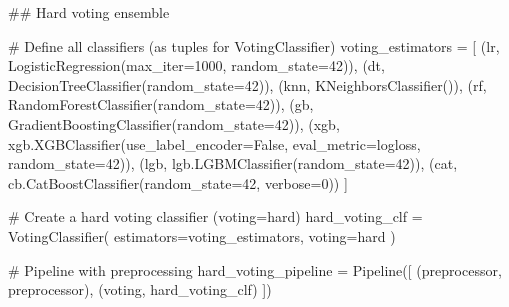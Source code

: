 \documentclass[
  letterpaper,
  DIV=11,
  numbers=noendperiod]{scrreprt}
\newenvironment{Shaded}{\begin{snugshade}}{\end{snugshade}}
\newcommand{\CommentTok}[1]{\textcolor[rgb]{0.37,0.37,0.37}{#1}}
\newcommand{\DecValTok}[1]{\textcolor[rgb]{0.68,0.00,0.00}{#1}}
\newcommand{\NormalTok}[1]{\textcolor[rgb]{0.00,0.23,0.31}{#1}}
\newcommand{\OperatorTok}[1]{\textcolor[rgb]{0.37,0.37,0.37}{#1}}
\newcommand{\StringTok}[1]{\textcolor[rgb]{0.13,0.47,0.30}{#1}}
\newcommand{\VariableTok}[1]{\textcolor[rgb]{0.07,0.07,0.07}{#1}}
\begin{document}
\begin{Shaded}
\begin{Highlighting}[]
\CommentTok{\#\# Hard voting ensemble}

\CommentTok{\# Define all classifiers (as tuples for VotingClassifier)}
\NormalTok{voting\_estimators }\OperatorTok{=}\NormalTok{ [}
\NormalTok{    (}\StringTok{\textquotesingle{}lr\textquotesingle{}}\NormalTok{, LogisticRegression(max\_iter}\OperatorTok{=}\DecValTok{1000}\NormalTok{, random\_state}\OperatorTok{=}\DecValTok{42}\NormalTok{)),}
\NormalTok{    (}\StringTok{\textquotesingle{}dt\textquotesingle{}}\NormalTok{, DecisionTreeClassifier(random\_state}\OperatorTok{=}\DecValTok{42}\NormalTok{)),}
\NormalTok{    (}\StringTok{\textquotesingle{}knn\textquotesingle{}}\NormalTok{, KNeighborsClassifier()),}
\NormalTok{    (}\StringTok{\textquotesingle{}rf\textquotesingle{}}\NormalTok{, RandomForestClassifier(random\_state}\OperatorTok{=}\DecValTok{42}\NormalTok{)),}
\NormalTok{    (}\StringTok{\textquotesingle{}gb\textquotesingle{}}\NormalTok{, GradientBoostingClassifier(random\_state}\OperatorTok{=}\DecValTok{42}\NormalTok{)),}
\NormalTok{    (}\StringTok{\textquotesingle{}xgb\textquotesingle{}}\NormalTok{, xgb.XGBClassifier(use\_label\_encoder}\OperatorTok{=}\VariableTok{False}\NormalTok{, eval\_metric}\OperatorTok{=}\StringTok{\textquotesingle{}logloss\textquotesingle{}}\NormalTok{, random\_state}\OperatorTok{=}\DecValTok{42}\NormalTok{)),}
\NormalTok{    (}\StringTok{\textquotesingle{}lgb\textquotesingle{}}\NormalTok{, lgb.LGBMClassifier(random\_state}\OperatorTok{=}\DecValTok{42}\NormalTok{)),}
\NormalTok{    (}\StringTok{\textquotesingle{}cat\textquotesingle{}}\NormalTok{, cb.CatBoostClassifier(random\_state}\OperatorTok{=}\DecValTok{42}\NormalTok{, verbose}\OperatorTok{=}\DecValTok{0}\NormalTok{))}
\NormalTok{]}

\CommentTok{\# Create a hard voting classifier (voting=\textquotesingle{}hard\textquotesingle{})}
\NormalTok{hard\_voting\_clf }\OperatorTok{=}\NormalTok{ VotingClassifier(}
\NormalTok{    estimators}\OperatorTok{=}\NormalTok{voting\_estimators,}
\NormalTok{    voting}\OperatorTok{=}\StringTok{\textquotesingle{}hard\textquotesingle{}}
\NormalTok{)}

\CommentTok{\# Pipeline with preprocessing}
\NormalTok{hard\_voting\_pipeline }\OperatorTok{=}\NormalTok{ Pipeline([}
\NormalTok{    (}\StringTok{\textquotesingle{}preprocessor\textquotesingle{}}\NormalTok{, preprocessor),}
\NormalTok{    (}\StringTok{\textquotesingle{}voting\textquotesingle{}}\NormalTok{, hard\_voting\_clf)}
\NormalTok{])}


\end{Highlighting}
\end{Shaded}
\end{document}
